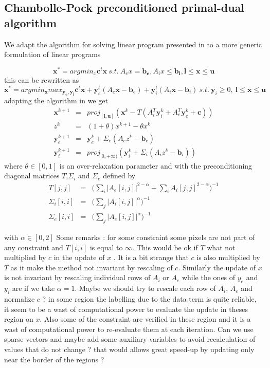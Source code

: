 \documentclass[11pt]{article}
\begin{document}
\subsection{Chambolle-Pock preconditioned primal-dual algorithm}
We adapt the algorithm for solving linear program presented in \cite{Chambolle2011} to a more generic formulation of linear programs


\begin{equation}
\mathbf{x}^*=argmin_x \mathbf{c}^t\mathbf{x} ~  s.t.~  A_ex=\mathbf{b_e},A_ix\leq\mathbf{ b_i}, \mathbf{l}\leq \mathbf{x}\leq \mathbf{u} 
\end{equation}
this can be rewritten as 
\begin{equation}
\mathbf{x}^*=argmin_\mathbf{x} max_{\mathbf{y_e},\mathbf{y_i}}\mathbf{c}^t\mathbf{x}+\mathbf{y}_e^t(A_e\mathbf{x}-\mathbf{b}_e)+ \mathbf{y}_i^t(A_i\mathbf{x}-\mathbf{b}_i)~  s.t.~ \mathbf{y}_i\geq 0,~ \mathbf{l}\leq \mathbf{x}\leq \mathbf{u} 
\end{equation}
adapting the algorithm in \cite{Chambolle2011}  we get
\begin{eqnarray}
\mathbf{x}^{k+1}&=&proj_{[\mathbf{l},\mathbf{u}]} (\mathbf{x}^k-T(A_i^T\mathbf{y}_i^k+A_e^T\mathbf{y}_e^k+\mathbf{c}))\\
z^k&=&(1+\theta)x^{k+1}-\theta x^k\\
\mathbf{y}_e^{k+1}&=&\mathbf{y}_e^k+\Sigma_e(A_e z^k-\mathbf{b}_e)\\
\mathbf{y}_i^{k+1}&=&proj_{[0,+\infty)}(\mathbf{y}_i^k+\Sigma_i(A_i z^k-\mathbf{b}_i))
\end{eqnarray}
where $\theta\in[0,1]$ is an over-relaxation parameter and with the preconditioning diagonal matrices $T$,$\Sigma_i$ and $\Sigma_e$ defined by
\begin{eqnarray}
T[j,j]&=&\big(\sum_i |A_e[i,j]|^{2-\alpha}+\sum_i A_i[j,j]^{2-\alpha}\big)^{-1}\\
\Sigma_i[i,i]&=&\big(\sum_j |A_i[i,j]|^{\alpha}\big)^{-1}\\
\Sigma_e[i,i]&=&\big(\sum_j |A_e[i,j]|^{\alpha}\big)^{-1}
\end{eqnarray}

with $\alpha\in[0,2]$
Some remarks : for some constraint some pixels are not part of any constraint and $T[i,i]$ is equal to $\infty$. This would be ok if $T$ what not multiplied by $c$ in the update of $x$ .
It is a bit strange that $c$ is also multiplied by $T$ as it make the method not invariant by rescaling of $c$. Similarly the update of $x$ is not invariant by rescaling individual rows of $A_i$ or $A_e$
while the ones of $y_e$ and $y_i$ are if we take $\alpha=1$.
Maybe we should try to rescale each row of $A_i$, $A_e$ and normalize $c$ ?
in some region the labelling due to the data term is quite reliable, 
it seem to be a wast of computational power to evaluate the update in theses region on $x$. Also some of the constraint are verified in these region and it is a wast of computational power to re-evaluate them at each iteration. Can we use sparse vectors and maybe add some auxiliary variables to avoid recalculation of values that do not change ? that would allows great speed-up by updating only near the border of the regions ?  
\end{document}
